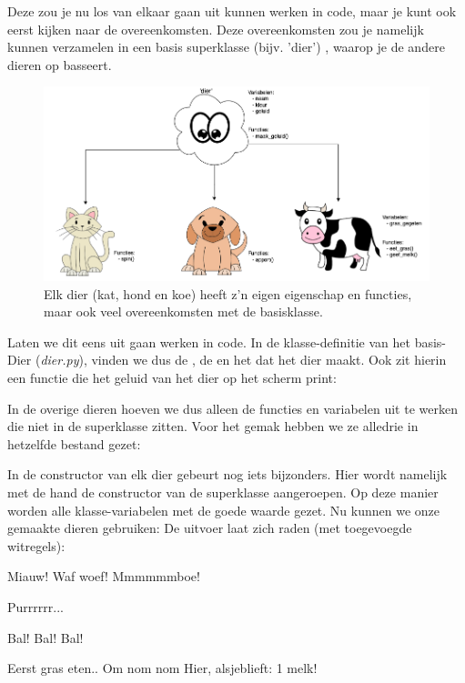 Deze zou je nu los van elkaar gaan uit kunnen werken in code, maar je kunt ook eerst kijken naar de overeenkomsten. Deze overeenkomsten zou je namelijk kunnen verzamelen in een basis superklasse (bijv. 'dier') , waarop je de andere dieren op basseert. \newline

\begin{figure}[h!]
\centering\includegraphics[scale=0.5]{Pictures/chapter08/animals_inh.png}
  \caption{\small Elk dier (kat, hond en koe) heeft z'n eigen eigenschap en functies, maar ook veel overeenkomsten met de basisklasse.} 
\label{fig:animals2} %
\end{figure}

Laten we dit eens uit gaan werken in code. In de klasse-definitie van het basis-Dier (\textit{dier.py}), vinden we dus de , de  en het  dat het dier maakt. Ook zit hierin een functie  die het geluid van het dier op het scherm print:

\newpage

In de overige dieren hoeven we dus alleen de functies en variabelen uit te werken die niet in de superklasse  zitten. Voor het gemak hebben we ze alledrie in hetzelfde bestand gezet: 

In de constructor van elk dier gebeurt nog iets bijzonders. Hier wordt namelijk met de hand de constructor van de superklasse  aangeroepen. Op deze manier worden alle klasse-variabelen met de goede waarde gezet. Nu kunnen we onze gemaakte dieren gebruiken:
De uitvoer laat zich raden (met toegevoegde witregels):
\begin{python}
Miauw!
Waf woef!
Mmmmmmboe!

Purrrrrr...

Bal! Bal! Bal!

Eerst gras eten..
Om nom nom
Hier, alsjeblieft: 1 melk!
\end{python}

